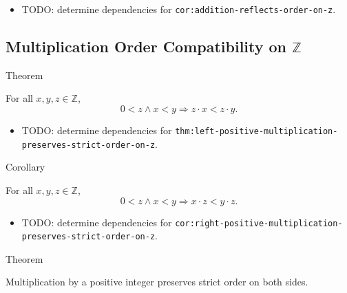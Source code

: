 \begin{dependencies}
\begin{itemize}
  \item TODO: determine dependencies for \texttt{cor:addition-reflects-order-on-z}.
\end{itemize}
\end{dependencies}

\subsection*{Multiplication Order Compatibility on $\mathbb{Z}$}

\begin{theorembox}{Theorem}
\begin{theorem}
\label{thm:left-positive-multiplication-preserves-strict-order-on-z}
For all $x,y,z\in\mathbb{Z}$,
\[
0<z\land x<y \Longrightarrow z\cdot x<z\cdot y.
\]
\end{theorem}
\end{theorembox}

\begin{dependencies}
\begin{itemize}
  \item TODO: determine dependencies for \texttt{thm:left-positive-multiplication-preserves-strict-order-on-z}.
\end{itemize}
\end{dependencies}

\begin{corollarybox}{Corollary}
\begin{corollary}
\label{cor:right-positive-multiplication-preserves-strict-order-on-z}
For all $x,y,z\in\mathbb{Z}$,
\[
0<z\land x<y \Longrightarrow x\cdot z<y\cdot z.
\]
\end{corollary}
\end{corollarybox}

\begin{dependencies}
\begin{itemize}
  \item TODO: determine dependencies for \texttt{cor:right-positive-multiplication-preserves-strict-order-on-z}.
\end{itemize}
\end{dependencies}

\begin{theorembox}{Theorem}
\begin{theorem}
\label{thm:positive-multiplication-preserves-strict-order-on-z}
Multiplication by a positive integer preserves strict order on both sides.
\end{theorem}
\end{theorembox}

